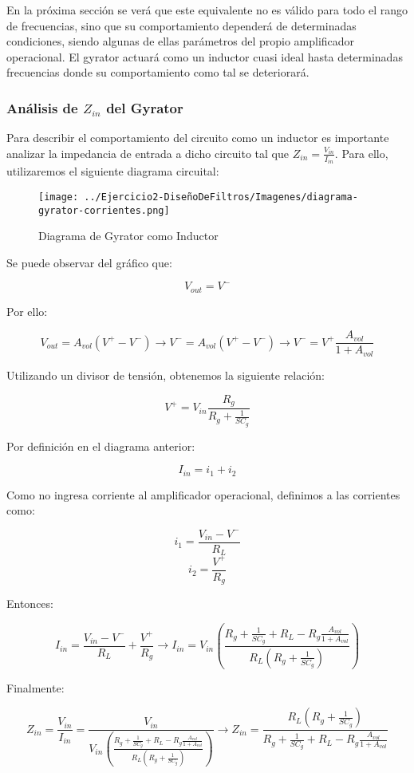 En la próxima sección se verá que este equivalente no es válido para todo el rango de frecuencias, sino que su comportamiento dependerá de 
determinadas condiciones, siendo algunas de ellas parámetros del propio amplificador operacional. 
El gyrator actuará como un inductor cuasi ideal hasta determinadas frecuencias donde su comportamiento 
como tal se deteriorará. 

\subsubsection{Análisis de $Z_{in}$ del Gyrator}

Para describir el comportamiento del circuito como un inductor es importante 
analizar la impedancia de entrada a dicho circuito tal que $Z_{in}=\frac{V_{in}}{I_{in}}$. 
Para ello, utilizaremos el siguiente diagrama circuital:

\begin{figure}[H]
    \centering
    \texttt{[image: ../Ejercicio2-DiseñoDeFiltros/Imagenes/diagrama-gyrator-corrientes.png]}
    \caption{Diagrama de Gyrator como Inductor}
\end{figure}

Se puede observar del gráfico que:

$$V_{out}=V^-$$

Por ello:

$$V_{out}=A_{vol}(V^+-V^-) \longrightarrow V^-=A_{vol}(V^+-V^-) 
\longrightarrow V^-= V^+ \frac{A_{vol}}{1+A_{vol}}$$

Utilizando un divisor de tensión, obtenemos la siguiente relación:

$$V^+= V_{in}\frac{R_g}{R_g+\frac{1}{SC_g}}$$

Por definición en el diagrama anterior:

$$I_{in}=i_1+i_2$$

Como no ingresa corriente al amplificador operacional, definimos a las corrientes como:

$$i_1=\frac{V_{in}-V^-}{R_L}$$
$$i_2=\frac{V^+}{R_g}$$

Entonces:

$$I_{in}=\frac{V_{in}-V^-}{R_L}+\frac{V^+}{R_g} \longrightarrow 
I_{in}=V_{in}(\frac{R_g+\frac{1}{SC_g}+R_L-R_g\frac{A_{vol}}{1+A_{vol}}}{R_L(R_g+\frac{1}{SC_g})})$$

Finalmente:

$$Z_{in}=\frac{V_{in}}{I_{in}}=\frac{V_{in}}{V_{in}(\frac{R_g+\frac{1}{SC_g}+R_L-R_g\frac{A_{vol}}{1+A_{vol}}}{R_L(R_g+\frac{1}{SC_g})})} \longrightarrow
Z_{in}=\frac{R_L(R_g+\frac{1}{SC_g})}{R_g+\frac{1}{SC_g}+R_L-R_g\frac{A_{vol}}{1+A_{vol}}}$$

